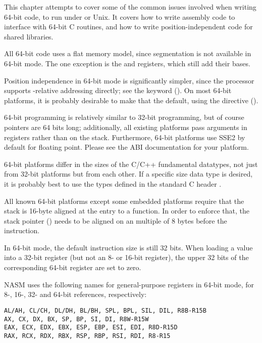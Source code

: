 %
%

This chapter attempts to cover some of the common issues involved when
writing 64-bit code, to run under  or Unix. It covers
how to write assembly code to interface with 64-bit C routines, and
how to write position-independent code for shared libraries.

All 64-bit code uses a flat memory model, since segmentation is not
available in 64-bit mode. The one exception is the  and
 registers, which still add their bases.

Position independence in 64-bit mode is significantly simpler, since
the processor supports -relative addressing directly; see the
 keyword (). On most 64-bit platforms,
it is probably desirable to make that the default, using the directive
 ().

64-bit programming is relatively similar to 32-bit programming, but
of course pointers are 64 bits long; additionally, all existing
platforms pass arguments in registers rather than on the stack.
Furthermore, 64-bit platforms use SSE2 by default for floating point.
Please see the ABI documentation for your platform.

64-bit platforms differ in the sizes of the C/C++ fundamental
datatypes, not just from 32-bit platforms but from each other. If a
specific size data type is desired, it is probably best to use the
types defined in the standard C header .

All known 64-bit platforms except some embedded platforms require that
the stack is 16-byte aligned at the entry to a function. In order to
enforce that, the stack pointer () needs to be aligned on an
 multiple of 8 bytes before the  instruction.

In 64-bit mode, the default instruction size is still 32 bits. When
loading a value into a 32-bit register (but not an 8- or 16-bit
register), the upper 32 bits of the corresponding 64-bit register are
set to zero.


NASM uses the following names for general-purpose registers in 64-bit
mode, for 8-, 16-, 32- and 64-bit references, respectively:

\begin{lstlisting}
AL/AH, CL/CH, DL/DH, BL/BH, SPL, BPL, SIL, DIL, R8B-R15B
AX, CX, DX, BX, SP, BP, SI, DI, R8W-R15W
EAX, ECX, EDX, EBX, ESP, EBP, ESI, EDI, R8D-R15D
RAX, RCX, RDX, RBX, RSP, RBP, RSI, RDI, R8-R15
\end{lstlisting}

